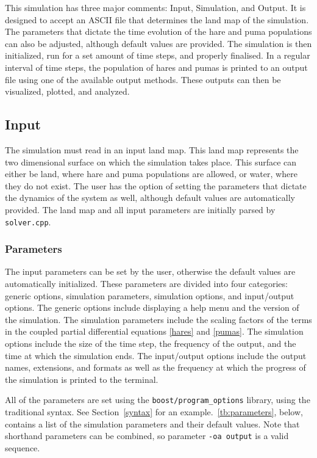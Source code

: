 \documentclass[a4paper,11pt]{article}
\begin{document}
{This simulation has three major comments: Input, Simulation, and Output.  
It is designed to accept an ASCII file that determines the land map of the simulation.
The parameters that dictate the time evolution of the hare and puma populations can also be adjusted, although default values are provided.  
The simulation is then initialized, run for a set amount of time steps, and properly finalised.  
In a regular interval of time steps, the population of hares and pumas is printed to an output file using one of the available output methods.  
These outputs can then be visualized, plotted, and analyzed.

\subsection{Input}

The simulation must read in an input land map.  
This land map represents the two dimensional surface on which the simulation takes place.  
This surface can either be land, where hare and puma populations are allowed, or water, where they do not exist.  
The user has the option of setting the parameters that dictate the dynamics of the system as well, although default values are automatically provided.  
The land map and all input parameters are initially parsed by \texttt{solver.cpp}.

\subsubsection{Parameters}\label{params}

The input parameters can be set by the user, otherwise the default values are automatically initialized.  
These parameters are divided into four categories: generic options, simulation parameters, simulation options, and input/output options.
The generic options include displaying a help menu and the version of the simulation.  
The simulation parameters include the scaling factors of the terms in the coupled partial differential equations \eqref{hares} and \eqref{pumas}.  
The simulation options include the size of the time step, the frequency of the output, and the time at which the simulation ends.  
The input/output options include the output names, extensions, and formats as well as the frequency at which the progress of the simulation is printed to the terminal.  

All of the parameters are set using the \texttt{boost/program\_options} library, using the traditional syntax. 
See Section~\ref{syntax} for an example.~\ref{tb:parameters}, below, contains a list of the simulation parameters and their default values. 
Note that shorthand parameters can be combined, so parameter \texttt{-oa output} is a valid sequence.

}
\end{document}
